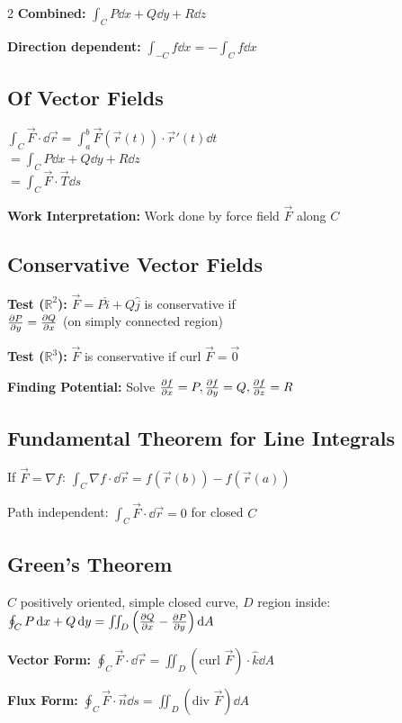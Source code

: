 \documentclass[8pt]{extarticle}
\newcommand{\R}{\mathbb{R}}
\begin{document}
\begin{multicols}{2}
\textbf{Combined:} $\int_C P\dd{x} + Q\dd{y} + R\dd{z}$

\textbf{Direction dependent:} $\int_{-C} f \dd{x} = -\int_C f \dd{x}$

\subsection*{Of Vector Fields}
$\int_C \vec{F} \cdot \dd{\vec{r}} = \int_a^b \vec{F}(\vec{r}(t)) \cdot \vec{r}'(t) \dd{t}$ \\
$= \int_C P\dd{x} + Q\dd{y} + R\dd{z}$ \\
$= \int_C \vec{F} \cdot \vec{T} \dd{s}$

\textbf{Work Interpretation:} Work done by force field $\vec{F}$ along $C$

\subsection*{Conservative Vector Fields}
\textbf{Test ($\R^2$):} $\vec{F} = P\hat{i} + Q\hat{j}$ is conservative if \\
$\pdv{P}{y} = \pdv{Q}{x}$ (on simply connected region)

\textbf{Test ($\R^3$):} $\vec{F}$ is conservative if $\text{curl }\vec{F} = \vec{0}$

\textbf{Finding Potential:} Solve $\pdv{f}{x} = P, \pdv{f}{y} = Q, \pdv{f}{z} = R$

\subsection*{Fundamental Theorem for Line Integrals}
If $\vec{F} = \nabla f$: $\int_C \nabla f \cdot \dd{\vec{r}} = f(\vec{r}(b)) - f(\vec{r}(a))$

Path independent: $\int_C \vec{F} \cdot \dd{\vec{r}} = 0$ for closed $C$

\subsection*{Green's Theorem}
$C$ positively oriented, simple closed curve, $D$ region inside: \\
$\oint_C P\dd{x} + Q\dd{y} = \iint_D \left(\pdv{Q}{x} - \pdv{P}{y}\right) \dd{A}$

\textbf{Vector Form:} $\oint_C \vec{F} \cdot \dd{\vec{r}} = \iint_D (\text{curl }\vec{F}) \cdot \hat{k} \dd{A}$

\textbf{Flux Form:} $\oint_C \vec{F} \cdot \vec{n} \dd{s} = \iint_D (\text{div }\vec{F}) \dd{A}$


\end{multicols}
\end{document}
